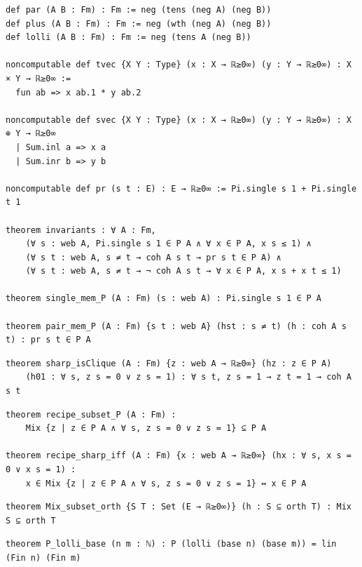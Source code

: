 \label{lean:linear-invariants}
\begin{lstlisting}
def par (A B : Fm) : Fm := neg (tens (neg A) (neg B))
def plus (A B : Fm) : Fm := neg (wth (neg A) (neg B))
def lolli (A B : Fm) : Fm := neg (tens A (neg B))

noncomputable def tvec {X Y : Type} (x : X → ℝ≥0∞) (y : Y → ℝ≥0∞) : X × Y → ℝ≥0∞ :=
  fun ab => x ab.1 * y ab.2

noncomputable def svec {X Y : Type} (x : X → ℝ≥0∞) (y : Y → ℝ≥0∞) : X ⊕ Y → ℝ≥0∞
  | Sum.inl a => x a
  | Sum.inr b => y b

noncomputable def pr (s t : E) : E → ℝ≥0∞ := Pi.single s 1 + Pi.single t 1

theorem invariants : ∀ A : Fm,
    (∀ s : web A, Pi.single s 1 ∈ P A ∧ ∀ x ∈ P A, x s ≤ 1) ∧
    (∀ s t : web A, s ≠ t → coh A s t → pr s t ∈ P A) ∧
    (∀ s t : web A, s ≠ t → ¬ coh A s t → ∀ x ∈ P A, x s + x t ≤ 1)

theorem single_mem_P (A : Fm) (s : web A) : Pi.single s 1 ∈ P A

theorem pair_mem_P (A : Fm) {s t : web A} (hst : s ≠ t) (h : coh A s t) : pr s t ∈ P A
\end{lstlisting}

\label{lean:sharp-isclique}
\begin{lstlisting}
theorem sharp_isClique (A : Fm) {z : web A → ℝ≥0∞} (hz : z ∈ P A)
    (h01 : ∀ s, z s = 0 ∨ z s = 1) : ∀ s t, z s = 1 → z t = 1 → coh A s t
\end{lstlisting}

\label{lean:recipe-subset-p}
\begin{lstlisting}
theorem recipe_subset_P (A : Fm) :
    Mix {z | z ∈ P A ∧ ∀ s, z s = 0 ∨ z s = 1} ⊆ P A

theorem recipe_sharp_iff (A : Fm) {x : web A → ℝ≥0∞} (hx : ∀ s, x s = 0 ∨ x s = 1) :
    x ∈ Mix {z | z ∈ P A ∧ ∀ s, z s = 0 ∨ z s = 1} ↔ x ∈ P A
\end{lstlisting}

\label{lean:mix-subset-orth}
\begin{lstlisting}
theorem Mix_subset_orth {S T : Set (E → ℝ≥0∞)} (h : S ⊆ orth T) : Mix S ⊆ orth T
\end{lstlisting}

\label{lean:p-lolli-base}
\begin{lstlisting}
theorem P_lolli_base (n m : ℕ) : P (lolli (base n) (base m)) = lin (Fin n) (Fin m)
\end{lstlisting}

